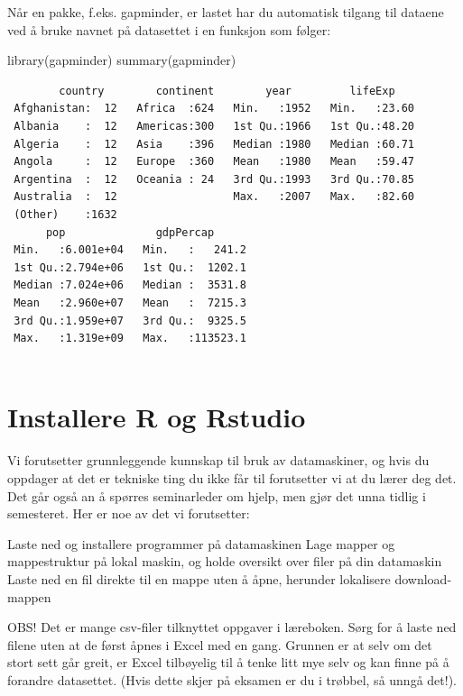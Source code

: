 \documentclass[
  letterpaper,
  DIV=11,
  numbers=noendperiod]{scrreprt}
\newenvironment{Shaded}{\begin{snugshade}}{\end{snugshade}}
\newcommand{\FunctionTok}[1]{\textcolor[rgb]{0.28,0.35,0.67}{#1}}
\newcommand{\NormalTok}[1]{\textcolor[rgb]{0.00,0.23,0.31}{#1}}
\theoremstyle{definition}
\theoremstyle{remark}
\begin{document}
Når en pakke, f.eks. gapminder, er lastet har du automatisk tilgang til
dataene ved å bruke navnet på datasettet i en funksjon som følger:

\begin{Shaded}
\begin{Highlighting}[]
\FunctionTok{library}\NormalTok{(gapminder)}
\FunctionTok{summary}\NormalTok{(gapminder)}
\end{Highlighting}
\end{Shaded}

\begin{verbatim}
        country        continent        year         lifeExp     
 Afghanistan:  12   Africa  :624   Min.   :1952   Min.   :23.60  
 Albania    :  12   Americas:300   1st Qu.:1966   1st Qu.:48.20  
 Algeria    :  12   Asia    :396   Median :1980   Median :60.71  
 Angola     :  12   Europe  :360   Mean   :1980   Mean   :59.47  
 Argentina  :  12   Oceania : 24   3rd Qu.:1993   3rd Qu.:70.85  
 Australia  :  12                  Max.   :2007   Max.   :82.60  
 (Other)    :1632                                                
      pop              gdpPercap       
 Min.   :6.001e+04   Min.   :   241.2  
 1st Qu.:2.794e+06   1st Qu.:  1202.1  
 Median :7.024e+06   Median :  3531.8  
 Mean   :2.960e+07   Mean   :  7215.3  
 3rd Qu.:1.959e+07   3rd Qu.:  9325.5  
 Max.   :1.319e+09   Max.   :113523.1  
                                       
\end{verbatim}

\hypertarget{installere-r-og-rstudio}{%
\chapter{Installere R og Rstudio}\label{installere-r-og-rstudio}}

Vi forutsetter grunnleggende kunnskap til bruk av datamaskiner, og hvis
du oppdager at det er tekniske ting du ikke får til forutsetter vi at du
lærer deg det. Det går også an å spørres seminarleder om hjelp, men gjør
det unna tidlig i semesteret. Her er noe av det vi forutsetter:

Laste ned og installere programmer på datamaskinen Lage mapper og
mappestruktur på lokal maskin, og holde oversikt over filer på din
datamaskin Laste ned en fil direkte til en mappe uten å åpne, herunder
lokalisere download-mappen

OBS! Det er mange csv-filer tilknyttet oppgaver i læreboken. Sørg for å
laste ned filene uten at de først åpnes i Excel med en gang. Grunnen er
at selv om det stort sett går greit, er Excel tilbøyelig til å tenke
litt mye selv og kan finne på å forandre datasettet. (Hvis dette skjer
på eksamen er du i trøbbel, så unngå det!).
\end{document}
